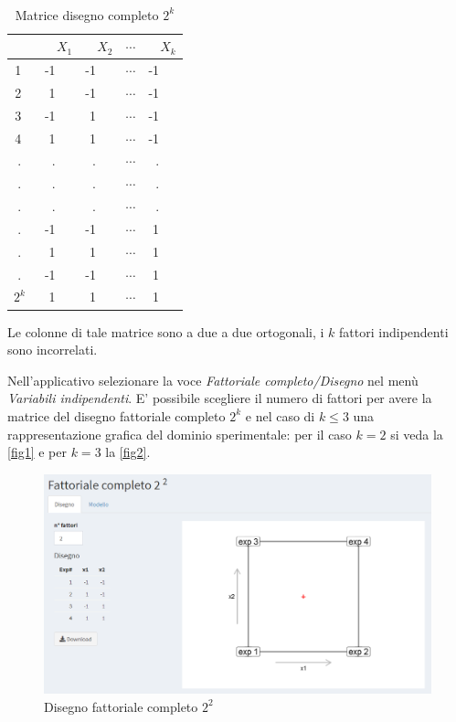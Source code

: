 \documentclass[
]{book}
\begin{document}
\begin{table}[ht]
\caption{Matrice disegno completo $2^k$}
\

\label{tab:MatrDisFull}
\centering
\begin{tabular}{rrrrr}
  \hline
       \vline& $X_1$ & $X_2$ & $\cdots$ &  $X_k$ \\
  \hline
  1 \    \vline& -1 \ \ & -1 \ \ & $\cdots$ &  -1 \ \ \\
  2 \    \vline& 1  \ \ & -1 \ \ & $\cdots$ & -1 \ \ \\
  3 \    \vline& -1 \ \ & 1  \ \ & $\cdots$ &-1 \ \ \\
  4 \    \vline& 1  \ \ & 1  \ \ & $\cdots$ &-1 \ \ \\
  . \    \vline& .  \ \ & .  \ \ & $\cdots$ & . \ \ \\
  . \    \vline& .  \ \ & .  \ \ & $\cdots$ & . \ \ \\
  . \    \vline& .  \ \ & .  \ \ & $\cdots$ & . \ \ \\
  . \    \vline& -1 \ \ & -1 \ \ & $\cdots$ & 1 \ \ \\
  . \    \vline& 1  \ \ & 1  \ \ & $\cdots$ & 1 \ \ \\
  . \    \vline& -1 \ \ & -1 \ \ & $\cdots$ &  1 \ \ \\
 $2^k$\  \vline& 1  \ \ & 1  \ \ & $\cdots$ & 1 \ \ \\
   \hline

\end{tabular}
\end{table}

Le colonne di tale matrice sono a due a due ortogonali, i \(k\) fattori indipendenti sono incorrelati.

Nell'applicativo selezionare la voce \emph{Fattoriale completo/Disegno} nel menù \emph{Variabili indipendenti}. E' possibile scegliere il numero di fattori per avere la matrice del disegno fattoriale completo \(2^k\) e nel caso di
\(k\leq 3\) una rappresentazione grafica del dominio sperimentale: per il caso \(k=2\) si veda la \autoref{fig1} e per \(k=3\) la \autoref{fig2}.

\begin{figure}

{\centering \includegraphics[width=1\linewidth]{Immagini/01_fattacompl2liv} 

}

\caption{Disegno fattoriale completo $2^2$\label{fig1}}\label{fig:unnamed-chunk-3}
\end{figure}
\end{document}
